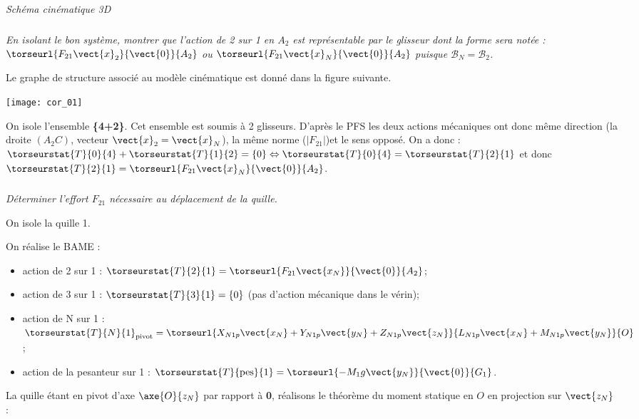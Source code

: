 \begin{multicols}{2}
\begin{center}

\textit{Schéma cinématique 3D}
\end{center}
\fi
\subparagraph{}\textit{
En isolant le bon système, montrer que l’action de 2 sur 1 en $A_2$ est représentable par le glisseur dont la forme sera notée : $\torseurl{F_{21}\vect{x}_2}{\vect{0}}{A_2}$ ou 
$\torseurl{F_{21}\vect{x}_N}{\vect{0}}{A_2}$ puisque $\mathcal{B}_N=\mathcal{B}_2$.}
\ifprof
\begin{corrige}
\begin{multicols}{2}
Le graphe de structure associé au modèle cinématique est donné dans la figure suivante. 
\begin{center}
\texttt{[image: cor\_01]}
\end{center}

On isole l'ensemble \textbf{\{4+2\}}. Cet ensemble est soumis à 2 glisseurs. D'après le PFS les deux actions mécaniques ont donc même direction (la droite $(A_2C)$, vecteur $\vect{x}_2=\vect{x}_N$), la même norme ($\left|F_{21} \right|$)et le sens opposé. On a donc : $\torseurstat{T}{0}{4}+\torseurstat{T}{1}{2}=\{0\} \Leftrightarrow \torseurstat{T}{0}{4}=\torseurstat{T}{2}{1}$ et donc  $\torseurstat{T}{2}{1}=\torseurl{F_{21}\vect{x}_N}{\vect{0}}{A_2}$.
\end{multicols}
\end{corrige}
\else
\fi

\subparagraph{}\textit{
Déterminer l'effort $F_{21}$ nécessaire au déplacement de la quille.}
\ifprof
\begin{corrige}
On isole la quille 1. 

On réalise le BAME : 
\begin{itemize}
\item action de 2 sur 1 : $\torseurstat{T}{2}{1}=\torseurl{F_{21}\vect{x_N}}{\vect{0}}{A_2}$;
\item action de 3 sur 1 : $\torseurstat{T}{3}{1}=\{0\}$ (pas d'action mécanique dans le vérin);
\item action de N sur 1 : $\torseurstat{T}{N}{1}_{\text{pivot}}=\torseurl{X_{N1p}\vect{x_N}+Y_{N1p}\vect{y_N}+Z_{N1p}\vect{z_N}}{L_{N1p}\vect{x_N}+M_{N1p}\vect{y_N}}{O}$;
\item action de la pesanteur sur 1 : $\torseurstat{T}{\text{pes}}{1}=\torseurl{-M_1g\vect{y_N}}{\vect{0}}{G_1}$.
\end{itemize}

La quille étant en pivot d'axe $\axe{O}{z_N}$ par rapport à \textbf{0}, réalisons le théorème du moment statique en $O$ en projection sur $\vect{z_N}$ :


\end{corrige}
\end{multicols}
